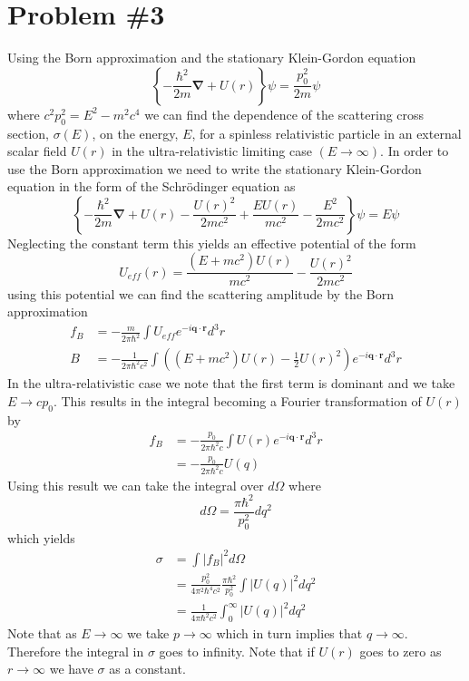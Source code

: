 \documentclass[11pt]{article}
\numberwithin{equation}{section}
\begin{document}
\section{Problem \#3}
Using the Born approximation and the stationary Klein-Gordon equation
$$\left\{-\frac{\hbar^2}{2m}\pmb{\nabla}+U(r)\right\}\psi = \frac{p_0^2}{2m}\psi$$
where $c^2p_0^2 = E^2-m^2c^4$ we can find the dependence of the scattering cross section,
$\sigma(E)$, on the energy, $E$, for a spinless relativistic particle in an external scalar
field $U(r)$ in the ultra-relativistic limiting case $(E\rightarrow\infty)$. In order to 
use the Born approximation we need to write the stationary Klein-Gordon equation in the
form of the Schr\"{o}dinger equation as 
$$\left\{-\frac{\hbar^2}{2m}\pmb{\nabla}+U(r)-\frac{U(r)^2}{2mc^2}+\frac{EU(r)}{mc^2}-\frac{E^2}{2mc^2}\right\}\psi = E\psi$$
Neglecting the constant term this yields an effective potential of the form
$$U_{eff}(r) = \frac{(E+mc^2)U(r)}{mc^2} - \frac{U(r)^2}{2mc^2}$$
using this potential we can find the scattering amplitude by the Born approximation
\begin{align*}
f_B &= -\frac{m}{2\pi\hbar^2}\int{U_{eff}}e^{-i\mathbf{q}\cdot\mathbf{r}}d^3r\\
B &= -\frac{1}{2\pi\hbar^2c^2}\int\left((E+mc^2)U(r) - \frac{1}{2}U(r)^2\right)e^{-i\mathbf{q}\cdot\mathbf{r}}d^3r
\end{align*}
In the ultra-relativistic case we note that the first term is dominant and we take $E\rightarrow{cp_0}$.
This results in the integral becoming a Fourier transformation of $U(r)$ by
\begin{align*}
f_B &= -\frac{p_0}{2\pi\hbar^2c}\int U(r)e^{-i\mathbf{q}\cdot\mathbf{r}}d^3r\\
&= -\frac{p_0}{2\pi\hbar^2c}U(q)
\end{align*}
Using this result we can take the integral over $d\Omega$ where 
$$d\Omega = \frac{\pi\hbar^2}{p_0^2}dq^2$$
which yields
\begin{align*}
\sigma &= \int|f_B|^2d\Omega\\
&= \frac{p_0^2}{4\pi^2\hbar^4c^2}\frac{\pi\hbar^2}{p_0^2}\int|U(q)|^2dq^2\\
&= \frac{1}{4\pi\hbar^2c^2}\int_{0}^{\infty}|U(q)|^2dq^2
\end{align*}
Note that as $E\rightarrow\infty$ we take $p\rightarrow\infty$ which in turn implies that 
$q\rightarrow\infty$. Therefore the integral in $\sigma$ goes to infinity. Note that if $U(r)$
goes to zero as $r\rightarrow\infty$ we have $\sigma$ as a constant.
\end{document}

